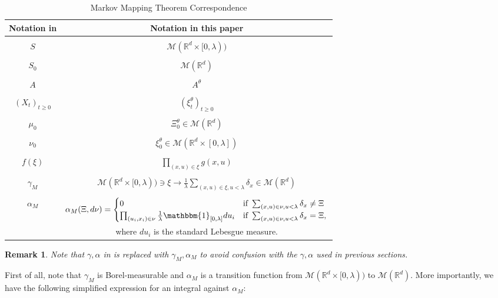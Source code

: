 \documentclass[12pt]{article}
\newtheorem{remark}[theorem]{Remark}
\begin{document}
\begin{table}[h]
    \centering
    \begin{tabular}{c|c}
    Notation in \cite{kurtz/rodrigues:2011} & Notation in this paper \\
    \hline\\
      $S$   &  $\mathcal{M}(\mathbb{R}^d \times [0, \lambda))$\\\\
       $S_0$  &  $\mathcal{M}(\mathbb{R}^d)$\\\\
       $A$ & $A^{\theta}$\\\\
       $(X_t)_{t \geq 0}$ & $(\xi^{\theta}_t)_{t \geq 0}$\\\\
       $\mu_0$ & $\Xi^{\theta}_0 \in \mathcal{M}(\mathbb{R}^d)$\\\\
       $\nu_0$ & $\xi^{\theta}_0 \in \mathcal{M}(\mathbb{R}^d \times [0,\lambda])$\\\\
       $f(\xi)$ & $\prod_{(x,u) \in \xi} g(x,u)$\\\\
        $\gamma_M$ & $ \mathcal{M}(\mathbb{R}^d \times [0, \lambda)) \ni \xi \to \frac{1}{\lambda}\sum_{(x,u) \in \xi, u < \lambda} \delta_{x} \in \mathcal{M}(\mathbb{R}^d)$\\\\
       $\alpha_M$ & $ \alpha_M(\Xi,d \nu) =     \begin{cases}
      0 & \text{if } \sum_{(x,u) \in \nu, u < \lambda} \delta_x \neq \Xi\\
       \prod_{(u_i,x_i) \in \nu} \frac{1}{\lambda} \mathbbm{1}_{[0,\lambda]}du_i & \text{if } \sum_{(x,u) \in \nu, u < \lambda} \delta_x = \Xi,\\
    \end{cases} $\\
&      where $du_i$ is the standard Lebesgue measure.
    \end{tabular}
    \caption{Markov Mapping Theorem Correspondence}
    \label{Markov Mapping Theorem Notation Table}
\end{table}
\begin{remark}
Note that $\gamma,\alpha$ in \cite{kurtz/rodrigues:2011} is replaced with $\gamma_M,\alpha_M$ to avoid confusion with the $\gamma, \alpha$ used in previous sections.
\end{remark}
First of all, note that $\gamma_M$ is Borel-measurable and $\alpha_M$ is a transition function from $\mathcal{M}(\mathbb{R}^d \times [0, \lambda))$ to $\mathcal{M}(\mathbb{R}^d)$. More importantly, we have the following simplified expression for an integral against $\alpha_M$:
\end{document}

